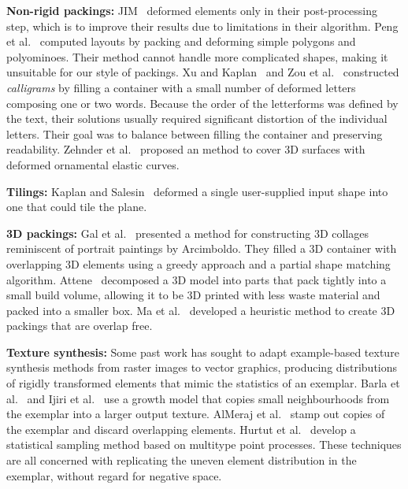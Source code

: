 \textbf{Non-rigid packings:}
JIM~\cite{Kim2002} deformed elements
only in their post-processing step, which is to improve their results due to limitations in their algorithm.
Peng et al.~\cite{Peng2014} computed layouts by packing and deforming
simple polygons and polyominoes. Their method cannot handle more
complicated shapes, making it unsuitable for our style of packings.
Xu and Kaplan~\cite{Xu2007} and Zou et al.~\cite{Zou2016}
constructed \textit{calligrams} by filling a container with a small
number of deformed letters composing one or two words.  Because the
order of the letterforms was defined by the text, their solutions
usually required significant distortion of the individual letters.
Their goal was to balance between filling the container and preserving
readability.
Zehnder et al.~\cite{Zehnder2016} proposed an method to
cover 3D surfaces with deformed ornamental elastic curves.



\textbf{Tilings:}
Kaplan and Salesin~\cite{Kaplan2000} deformed a single user-supplied 
input shape into one that could tile the plane.

\textbf{3D packings:}
Gal et al.~\cite{Gal2007B} presented a method for constructing 3D
collages reminiscent of portrait paintings by Arcimboldo.  They
filled a 3D container with overlapping 3D elements using a greedy
approach and a partial shape matching algorithm.
Attene~\cite{Attene2015} decomposed a 3D model into parts that pack
tightly into a small build volume, allowing it to 
be 3D printed with less waste material and packed into a smaller box.
Ma et al.~\cite{Ma2018} developed a heuristic method
to create 3D packings that are overlap free.

\textbf{Texture synthesis:}
Some past work has sought to adapt example-based texture synthesis methods
from raster images to vector graphics, producing distributions of rigidly transformed elements
that mimic the statistics of an exemplar.  Barla et al.~\cite{Barla2006} and
Ijiri et al.~\cite{Ijiri2008} use a growth model that copies small neighbourhoods
from the exemplar into a larger output texture.  AlMeraj et al.~\cite{AlMeraj2013}
stamp out copies of the exemplar and discard overlapping elements.
Hurtut et al.~\cite{Hurtut2009} develop a statistical sampling method based
on multitype point processes.  
These techniques are all concerned with replicating
the uneven element distribution in the exemplar, without regard for negative space.

